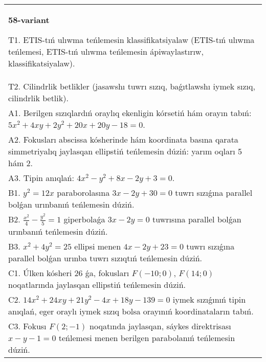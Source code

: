 \documentclass{article}
\begin{document}
\begin{tabular}{m{17cm}}
\textbf{58-variant}
\newline

T1. ETIS-tıń ulıwma teńlemesin klassifikatsiyalaw (ETIS-tıń ulıwma teńlemesi, ETIS-tıń ulıwma teńlemesin ápiwaylastırıw, klassifikatsiyalaw).\\

T2. Cilindrlik betlikler (jasawshı tuwrı sızıq, baǵıtlawshı iymek sızıq, cilindrlik betlik).\\

A1. Berilgen sızıqlardıń oraylıq ekenligin kórsetiń hám orayın tabıń: $5 x^{2}+4 xy+2 y^{2}+20 x+20 y-18=0$.\\

A2. Fokusları abscissa kósherinde hám koordinata basına qarata simmetriyalıq jaylasqan ellipstiń teńlemesin dúziń: yarım oqları 5 hám 2.\\

A3. Tipin anıqlań: $4 x^{2}-y^{2}+8 x-2 y+3=0$.\\

B1. $y^{2} = 12x$ paraborolasına $3x - 2y + 30 = 0$ tuwrı sızıǵına parallel bolǵan urınbanıń teńlemesin dúziń.  \\

B2. $\frac{x^{2}}{4} - \frac{y^{2}}{5} = 1$ giperbolaǵa $3x - 2y = 0$ tuwrısına parallel bolǵan urınbanıń teńlemesin dúziń.  \\

B3. $x^{2} + 4y^{2} = 25$ ellipsi menen $4x - 2y + 23 = 0$ tuwrı sızıǵına parallel bolǵan urınba tuwrı sızıqtıń teńlemesin dúziń.  \\

C1. Úlken kósheri 26 ǵa, fokusları $F( - 10;0)$, $F(14;0)$ noqatlarında jaylasqan ellipstiń teńlemesin dúziń.  \\

C2. $14x^{2} + 24xy + 21y^{2} - 4x + 18y - 139 = 0$ iymek sızıǵınıń tipin anıqlań, eger oraylı iymek sızıq bolsa orayınıń koordinataların tabıń.  \\

C3. Fokusı $F(2; - 1)$ noqatında jaylasqan, sáykes direktrisası $x - y - 1 = 0$ teńlemesi menen berilgen parabolanıń teńlemesin dúziń.  \\

\end{tabular}
\vspace{1cm}
\end{document}
